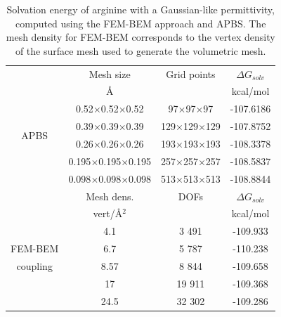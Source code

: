 \begin{table}
\centering
\begin{tabular}{c|c|c|c}
&Mesh size  & Grid points & $\Delta G_{solv}$\\
&\AA       & &  kcal/mol \\
\hline
\multirow{4}{*}{APBS}& 0.52$\times$0.52$\times$0.52 & 97$\times$97$\times$97 & -107.6186 \\ 
& 0.39$\times$0.39$\times$0.39 & 129$\times$129$\times$129 & -107.8752\\ 
&0.26$\times$0.26$\times$0.26 & 193$\times$193$\times$193& -108.3378\\ 
&0.195$\times$0.195$\times$0.195 & 257$\times$257$\times$257& -108.5837\\ 
&0.098$\times$0.098$\times$0.098 & 513$\times$513$\times$513& -108.8844\\ 
\hline
&Mesh dens. & DOFs & $\Delta G_{solv}$\\
&vert/\AA$^2$   &  &  kcal/mol \\
\hline
    & 4.1 & 3 491 & -109.933 \\
FEM-BEM    & 6.7  & 5 787 & -110.238 \\
coupling    & 8.57  & 8 844 & -109.658 \\
    & 17 & 19 911 & -109.368 \\
    & 24.5 & 32 302 & -109.286 \\
\hline
\end{tabular}
\caption{Solvation energy of arginine with a Gaussian-like permittivity, computed using the FEM-BEM approach and APBS. The mesh density for FEM-BEM corresponds to the vertex density of the surface mesh used to generate the volumetric mesh.}
\label{table:arg_variable}
\end{table}



